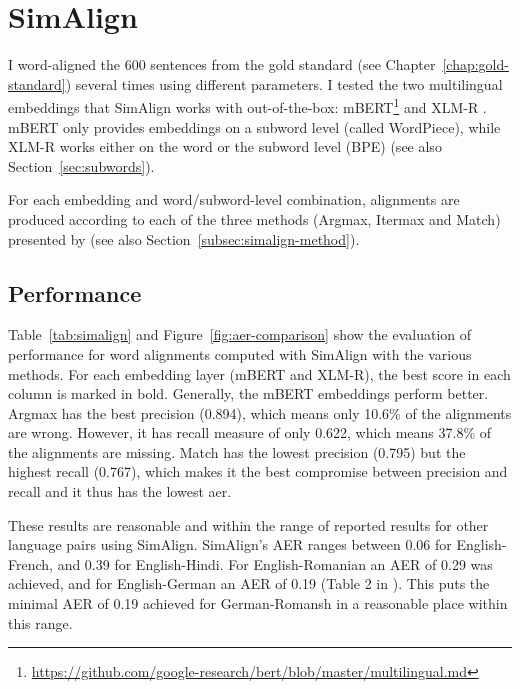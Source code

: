 \section{SimAlign}\label{sec:performance-simalign}
I word-aligned the 600 sentences from the gold standard (see Chapter~\ref{chap:gold-standard}) several times using different parameters. 
I tested the two multilingual embeddings that SimAlign works with out-of-the-box: mBERT\footnote{\url{https://github.com/google-research/bert/blob/master/multilingual.md}} and XLM-R \autocite{conneau-etal-2020-xlm}. 
mBERT only provides embeddings on a subword level (called WordPiece), while XLM-R works either on the word or the subword level (BPE) \autocite{jalili-sabet-etal-2020-simalign} (see also Section~\ref{sec:subwords}). 

For each embedding and word/subword-level combination, alignments are produced according to each of the three methods (Argmax, Itermax and Match) presented by \cite{jalili-sabet-etal-2020-simalign} (see also Section~\ref{subsec:simalign-method}).

\subsection{Performance}
Table~\ref{tab:simalign} and Figure~\ref{fig:aer-comparison} show the evaluation of performance for word alignments computed with SimAlign with the various methods. 
For each embedding layer (mBERT and XLM-R), the best score in each column is marked in bold. 
Generally, the mBERT embeddings perform better. 
Argmax has the best precision (0.894), which means only 10.6\% of the alignments are wrong. 
However, it has recall measure of only 0.622, which means 37.8\% of the alignments are missing.
Match has the lowest precision (0.795) but the highest recall (0.767), which makes it the best compromise between precision and recall and it thus has the lowest \acrshort{aer}.

These results are reasonable and within the range of reported results for other language pairs using SimAlign. 
SimAlign's AER ranges between 0.06 for English-French, and 0.39 for English-Hindi. 
For English-Romanian an AER of 0.29 was achieved, and for English-German an AER of 0.19 (Table 2 in \cite{jalili-sabet-etal-2020-simalign}). 
This puts the minimal AER of 0.19 achieved for German-Romansh in a reasonable place within this range.

